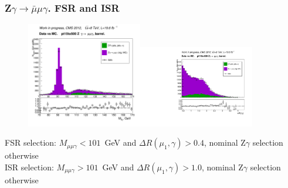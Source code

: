 \begin{frame}\frametitle{Z$\gamma\rightarrow{\bar{\mu}}\mu\gamma$. FSR and ISR}
  \begin{figure}[htb]
    \begin{center}
       \includegraphics[width=0.45\textwidth]{../figs/figs_v11/MUON_ZGamma/PrepareYields/c_TotalDATAvsMC_Barrel__MpholeplepVERY_PRELIMINARY_pt15to500_.png}\includegraphics[width=0.45\textwidth]{../figs/figs_v11/MUON_ZGamma/PrepareYields/c_TotalDATAvsMC_Barrel__lep1PhoDeltaRVERY_PRELIMINARY_pt15to500_.pdf}\\
    \end{center}
  \end{figure}
\scriptize
FSR selection: $M_{\mu\mu\gamma}<101$~GeV and $\Delta R(\mu_{1},\gamma)>0.4$, nominal Z$\gamma$ selection otherwise\\
ISR selection: $M_{\mu\mu\gamma}>101$~GeV and $\Delta R(\mu_{1},\gamma)>1.0$, nominal Z$\gamma$ selection otherwise
\end{frame}%

